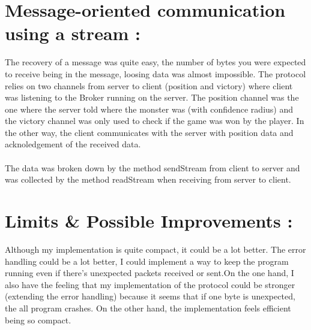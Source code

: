 \documentclass{article}
\begin{document}
\section{Message-oriented communication using a stream :}
The recovery of a message was quite easy, the number of bytes you were expected to receive being in the message, loosing data was almost impossible. 
The protocol relies on two channels from server to client (position and victory) where client was listening to the Broker running on the server. The position channel was the one where the server 
told where the monster was (with confidence radius) and the victory channel was only used to check if the game was won by the player. In the other way, the client communicates with the server with position 
data and acknoledgement of the received data.
\\\\
The data was broken down by the method sendStream from client to server and was collected by the method readStream when receiving from server to client.
\section{Limits \& Possible Improvements :}
Although my implementation is quite compact, it could be a lot better. The error handling could be a lot better, I could implement a way to keep the 
program running even if there's unexpected packets received or sent.On the one hand, I also have the feeling that my implementation of the protocol could be stronger (extending the error handling) 
because it seems that if one byte is unexpected, the all program crashes. On the other hand, the implementation feels efficient being so compact.
\end{document}
